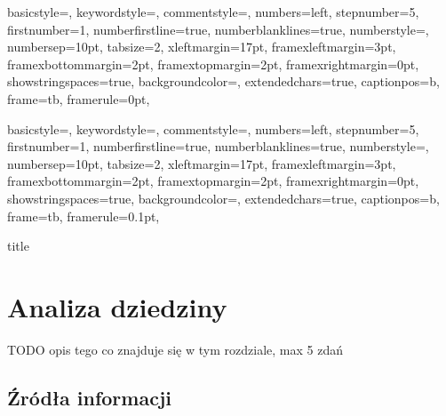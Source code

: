 \documentclass[a4paper,onecolumn,oneside,11pt,wide,floatssmall]{mwrep}
\theoremstyle{definition}
\theoremstyle{plain}%
\theoremstyle{remark}
\begin{document}
{
basicstyle={\footnotesize},
keywordstyle={\bf\footnotesize\color{blue}},
commentstyle={\em\footnotesize\color{magenta}},
numbers=left,
stepnumber=5,
firstnumber=1,
numberfirstline=true,
numberblanklines=true,
numberstyle={\sf\tiny},
numbersep=10pt,
tabsize=2,
xleftmargin=17pt,
framexleftmargin=3pt,
framexbottommargin=2pt,
framextopmargin=2pt,
framexrightmargin=0pt,
showstringspaces=true,
backgroundcolor={\color{ListingBackground}},
extendedchars=true,
captionpos=b,
frame=tb,
framerule=0pt,
}

{
basicstyle={\footnotesize},
keywordstyle={\bf\footnotesize\color{blue}},
commentstyle={\em\footnotesize\color{magenta}},
numbers=left,
stepnumber=5,
firstnumber=1,
numberfirstline=true,
numberblanklines=true,
numberstyle={\sf\tiny},
numbersep=10pt,
tabsize=2,
xleftmargin=17pt,
framexleftmargin=3pt,
framexbottommargin=2pt,
framextopmargin=2pt,
framexrightmargin=0pt,
showstringspaces=true,
backgroundcolor={\color{ListingBackground}},
extendedchars=true,
captionpos=b,
frame=tb,
framerule=0.1pt,
}

\renewcommand*\lstlistingname{Wydruk}
\renewcommand*\lstlistlistingname{Spis wydruków}

\renewcommand{\baselinestretch}{1.0}
\raggedbottom
 {title}

\tableofcontents


\newpage
{}
\setcounter{page}{1}


\chapter{Analiza dziedziny} 
\label{analiza-dziedziny}
TODO opis tego co znajduje się w tym rozdziale, max 5 zdań


\section{Źródła informacji}
\end{document}
